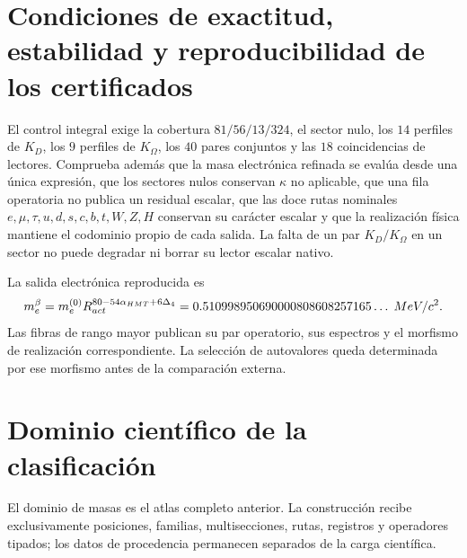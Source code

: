 \section{Condiciones de exactitud, estabilidad y reproducibilidad de los certificados}
\label{sec:ejecucion-tabla-masas-acumulativa}

El control integral exige la cobertura \(81/56/13/324\), el sector nulo, los
\(14\) perfiles de \(K_D\), los \(9\) perfiles de \(K_\Omega\), los
\(40\) pares conjuntos y las \(18\) coincidencias de lectores. Comprueba
además que la masa electrónica refinada se evalúa desde una única expresión,
que los sectores nulos conservan \(\kappa\) no aplicable, que una fila
operatoria no publica un residual escalar, que las doce rutas nominales
\(e,\mu,\tau,u,d,s,c,b,t,W,Z,H\) conservan su carácter escalar y que la
realización física mantiene el codominio propio de cada salida. La falta de un par
\(K_D/K_\Omega\) en un sector no puede degradar ni borrar su lector escalar
nativo.

La salida electrónica reproducida es
\[
m_e^\beta
=m_e^{(0)}R_{\rm act}^{80-54\alpha_{\rm HMT}+6\Delta_4}
=0.510998950690000808608257165\ldots\;\mathrm{MeV}/c^2.
\]
Las fibras de rango mayor publican su par operatorio, sus espectros y el
morfismo de realización correspondiente. La selección de autovalores queda
determinada por ese morfismo antes de la comparación externa.


\section{Dominio científico de la clasificación}
\label{sec:alcance-publico-apendices-acumulativo}

El dominio de masas es el atlas completo anterior. La construcción recibe
exclusivamente posiciones, familias, multisecciones, rutas, registros y
operadores tipados; los datos de procedencia permanecen separados de la carga
científica.
